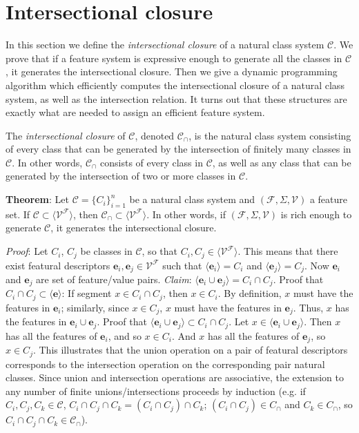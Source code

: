 \documentclass[11pt, oneside]{article}   	%
\begin{document}
\section{Intersectional closure}

In this section we define the \textit{intersectional closure} of a natural class system $\mathcal C$. We prove that if a feature system is expressive enough to generate all the classes in $\mathcal C$, it generates the intersectional closure. Then we give a dynamic programming algorithm which efficiently computes the intersectional closure of a natural class system, as well as the intersection relation. It turns out that these structures are exactly what are needed to assign an efficient feature system.

The \textit{intersectional closure} of $\mathcal C$, denoted $\mathcal C_\cap$, is the natural class system consisting of every class that can be generated by the intersection of finitely many classes in $\mathcal C$. In other words, $\mathcal C_\cap$ consists of every class in $\mathcal C$, as well as any class that can be generated by the intersection of two or more classes in $\mathcal C$.

\vspace{\baselineskip} \noindent \textbf{Theorem}: Let $\mathcal C = \{C_i\}_{i=1}^n$ be a natural class system and $(\mathcal F, \Sigma, \mathcal V)$ a feature set. If $\mathcal C \subset \langle \mathcal V^\mathcal F \rangle $, then $\mathcal C_\cap \subset\langle \mathcal V^\mathcal F \rangle $. In other words, if $(\mathcal F, \Sigma, \mathcal V)$ is rich enough to generate $\mathcal C$, it generates the intersectional closure.

\textit{Proof}: Let $C_i$, $C_j$ be classes in $\mathcal C$, so that $C_i, C_j \in \langle \mathcal V^\mathcal F \rangle$.
This means that there exist featural descriptors $\mathbf{e}_i, \mathbf{e}_j \in \mathcal V^\mathcal F$ such that $\langle \mathbf{e}_i \rangle = C_i$ and $\langle \mathbf{e}_j \rangle = C_j$.
Now $\mathbf{e}_i$ and $\mathbf{e}_j$ are set of feature/value pairs.
\textit{Claim}: $\langle \mathbf{e}_i \cup \mathbf{e}_j \rangle = C_i \cap C_j$.
Proof that $C_i \cap C_j \subset \langle \mathbf{e} \rangle$: If segment $x \in C_i \cap C_j$, then $x \in C_i$.
By definition, $x$ must have the features in $\mathbf{e}_i$; similarly, since $x \in C_j$, $x$ must have the features in $\mathbf{e}_j$. Thus, $x$ has the features in $\mathbf{e}_i \cup \mathbf{e}_j$.
Proof that $\langle \mathbf{e}_i \cup \mathbf{e}_j \rangle \subset C_i \cap C_j$. Let $x \in \langle \mathbf{e}_i \cup \mathbf{e}_j \rangle$. Then $x$ has all the features of $\mathbf{e}_i$, and so $x \in C_i$. And $x$ has all the features of $\mathbf{e}_j$, so $x \in C_j$.
This illustrates that the union operation on a pair of featural descriptors corresponds to the intersection operation on the corresponding pair natural classes.
Since union and intersection operations are associative, the extension to any number of finite unions/intersections proceeds by induction (e.g. if $C_i, C_j, C_k \in \mathcal C$, $C_i \cap C_j \cap C_k = (C_i \cap C_j) \cap C_k$; $(C_i \cap C_j) \in C_\cap$ and $C_k \in C_{\cap}$, so $C_i \cap C_j \cap C_k \in \mathcal C_\cap$).
\end{document}
